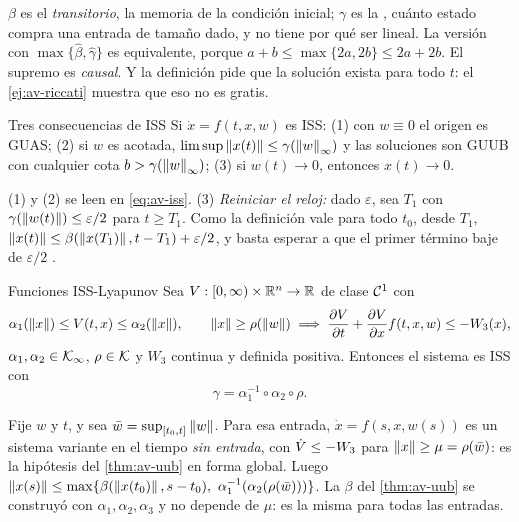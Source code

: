 $\beta$ es el \emph{transitorio}, la memoria de la condición inicial; $\gamma$ es la , cuánto estado compra una entrada de tamaño dado, y no tiene por qué ser lineal. La versión con $\max\{\hat\beta,\hat\gamma\}$ es equivalente, porque $a+b\le\max\{2a,2b\}\le2a+2b$. El supremo es \emph{causal}. Y la definición pide que la solución exista para todo $t$: el \cref{ej:av-riccati} muestra que eso no es gratis.

\begin{proposicion}[label=prop:av-issconsec]{Tres consecuencias de ISS}
Si $\dot x=f(t,x,w)$ es ISS: (1) con $w\equiv0$ el origen es GUAS; (2) si $w$ es acotada, $\limsup\left\lVert x(t)\right\rVert\le\gamma(\left\lVert w\right\rVert_\infty)$ y las soluciones son GUUB con cualquier cota $b>\gamma(\left\lVert w\right\rVert_\infty)$; (3) si $w(t)\to0$, entonces $x(t)\to0$.
\end{proposicion}

\begin{demostracion}
(1) y (2) se leen en \eqref{eq:av-iss}. (3) \emph{Reiniciar el reloj:} dado $\varepsilon$, sea $T_1$ con $\gamma(\left\lVert w(t)\right\rVert)\le\varepsilon/2$ para $t\ge T_1$. Como la definición vale para todo $t_0$, desde $T_1$, $\left\lVert x(t)\right\rVert\le\beta(\left\lVert x(T_1)\right\rVert,t-T_1)+\varepsilon/2$, y basta esperar a que el primer término baje de $\varepsilon/2$ \citep[Lec.~14]{Arc18}.
\end{demostracion}

\begin{teorema}[label=thm:av-isslyap]{Funciones ISS-Lyapunov \citep[Teo.~4.19]{Kha02}}
Sea $V:[0,\infty)\times\mathbb{R}^n\to\mathbb{R}$ de clase $\mathcal{C}^{1}$ con
\[
  \alpha_1(\left\lVert x\right\rVert)\le V(t,x)\le\alpha_2(\left\lVert x\right\rVert),\qquad\left\lVert x\right\rVert\ge\rho(\left\lVert w\right\rVert)\;\Longrightarrow\;\frac{\partial V}{\partial t}+\frac{\partial V}{\partial x}f(t,x,w)\le-W_3(x),
\]
$\alpha_1,\alpha_2\in\mathcal{K}_{\infty}$, $\rho\in\mathcal{K}$ y $W_3$ continua y definida positiva. Entonces el sistema es ISS con
\begin{equation}
  \gamma=\alpha_1^{-1}\circ\alpha_2\circ\rho .
  \label{eq:av-gananciaiss}
\end{equation}
\end{teorema}

\begin{demostracion}
 Fije $w$ y $t$, y sea $\bar w=\sup_{[t_0,t]}\left\lVert w\right\rVert$. Para esa entrada, $\dot x=f(s,x,w(s))$ es un sistema variante en el tiempo \emph{sin entrada}, con $\dot V\le-W_3$ para $\left\lVert x\right\rVert\ge\mu=\rho(\bar w)$: es la hipótesis del \cref{thm:av-uub} en forma global. Luego $\norm{x(s)}\le\max\{\beta(\norm{x(t_0)},s-t_0),\ \alpha_1^{-1}(\alpha_2(\rho(\bar w)))\}$. La $\beta$ del \cref{thm:av-uub} se construyó con $\alpha_1,\alpha_2,\alpha_3$ y no depende de $\mu$: es la misma para todas las entradas.
\end{demostracion}

